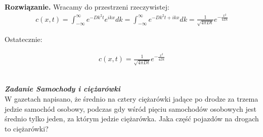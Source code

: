 \documentclass[11pt,a4paper]{article}
\newcounter{zadanie}\newcommand{\zadanie}[1][]{\addtocounter{zadanie}{1} ~\\  {\bf \emph{Zadanie \arabic{zadanie} #1 }} \\}
\newenvironment{solution}{\vspace{1cm} \par\textbf{Rozwiązanie.} \vspace{1cm}}{}
\begin{document}
\begin{solution}
Wracamy do przestrzeni rzeczywistej:
\begin{align*}
    c(x,t) = \int_{-\infty}^{\infty} e^{-Dk^2 t} e^{ikx} dk = 
    \int_{-\infty}^{\infty} e^{-Dk^2 t + ikx} dk = 
    \frac{1}{\sqrt{4\pi Dt}} e^{-\frac{x^2}{4Dt}}
\end{align*}

Ostatecznie:

\begin{align*}
    c(x, t) = \frac{1}{\sqrt{4\pi Dt}} e^{-\frac{x^2}{4Dt}}
\end{align*}

\newpage
\end{solution}

\zadanie[Samochody i ciężarówki]

W gazetach napisano, że średnio na cztery ciężarówki jadące po drodze za trzema 
jedzie samochód osobowy, podczas gdy wśród pięciu samochodów osobowych 
jest średnio tylko jeden, za którym jedzie ciężarówka. 
Jaka część pojazdów na drogach to ciężarówki?
\end{document}
